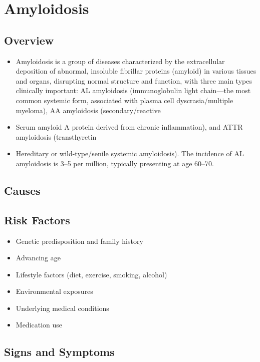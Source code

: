 \chapter{Amyloidosis}
\label{sec:Amyloidosis}

\section{Overview}


\begin{itemize}[noitemsep]
  \item Amyloidosis is a group of diseases characterized by the extracellular deposition of abnormal, insoluble fibrillar proteins (amyloid) in various tissues and organs, disrupting normal structure and function, with three main types clinically important: AL amyloidosis (immunoglobulin light chain---the most common systemic form, associated with plasma cell dyscrasia/multiple myeloma), AA amyloidosis (secondary/reactive
  \item Serum amyloid A protein derived from chronic inflammation), and ATTR amyloidosis (transthyretin
  \item Hereditary or wild-type/senile systemic amyloidosis). The incidence of AL amyloidosis is 3--5 per million, typically presenting at age 60--70.
\end{itemize}
\section{Causes}
\section{Risk Factors}

\begin{itemize}[noitemsep]
  \item Genetic predisposition and family history
  \item Advancing age
  \item Lifestyle factors (diet, exercise, smoking, alcohol)
  \item Environmental exposures
  \item Underlying medical conditions
  \item Medication use
\end{itemize}
\section{Signs and Symptoms}

